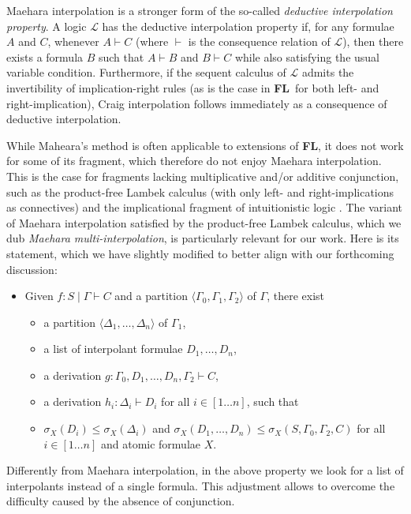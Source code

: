 \documentclass[sn-mathphys-num]{sn-jnl}%
\newcommand{\GG}{\Gamma}
\newcommand{\GD}{\Delta}
\newcommand{\vd}{\vdash}
\newcommand{\mc}[1]{\mathcal{#1}}
\newcommand{\mf}[1]{\mathsf{#1}}
\newcommand{\gs}[1]{\sigma_{X} (#1)}
\newcommand{\vars}[1]{\mf{var} (#1)}
\newcommand{\FL}{\textbf{FL}}
\newcommand{\niccolo}[1]{\textcolor{red}{#1}}
\theoremstyle{thmstyleone}%
\theoremstyle{thmstyletwo}%
\theoremstyle{thmstylethree}%
\begin{document}
Maehara interpolation is a stronger form of the so-called \emph{deductive interpolation property}. A logic $\mc{L}$ has the deductive interpolation property if, for any formulae $A$ and $C$, whenever $A \vd C$ (where $\vd$ is the consequence relation of $\mc{L}$), then there exists a formula $B$ such that $A \vd B$ and $B \vd C$ while also satisfying the usual variable condition. Furthermore, if the sequent calculus of $\mc{L}$ admits the invertibility of implication-right rules (as is the case in \FL\ for both left- and right-implication), Craig interpolation follows immediately as a consequence of deductive interpolation.

While Maheara's method is often applicable to extensions of \FL, it does not work for some of its fragment, which therefore do not enjoy Maehara interpolation. This is the case for fragments lacking multiplicative and/or additive conjunction, such as the product-free Lambek calculus \cite{Pentus1997} (with only left- and right-implications as connectives) and the implicational fragment of intuitionistic logic \cite{Kanazawa2006}. 
The variant of Maehara interpolation satisfied by the product-free Lambek calculus, which we dub \emph{Maehara multi-interpolation}, is particularly relevant for our work. Here is its statement, which we have slightly modified to better align with our forthcoming discussion:
\begin{itemize}
  \item[\ ]  Given $f: S \mid \Gamma \vd C$ and a partition $\langle \GG_0,\GG_1, \GG_2 \rangle$ of $\GG$, there exist 
    \begin{itemize}
    \item[--] a partition $\langle \GD_1, \dots, \GD_n \rangle$ of $\GG_1$,
    \item[--] a list of interpolant formulae $D_1, \dots, D_n$,
    \item[--] a derivation $g: \GG_0, D_1, \dots, D_n, \GG_2 \vd C$,
    \item[--] a derivation $h_i : \GD_i \vd D_i$ for all $i \in [1\dots n]$, such that
    \item[--] $\gs{D_i} \leq \gs{\GD_i}$ and $\gs{D_1, \dots, D_n} \leq \gs{S, \GG_0, \GG_2, C}$ for all $i \in [1 \dots n]$ and atomic formulae $X$.
  \end{itemize}
\end{itemize}
Differently from Maehara interpolation, in the above property we look for a  list of interpolants instead of a single formula.
This adjustment allows to overcome the difficulty caused by the absence of conjunction.
\end{document}
